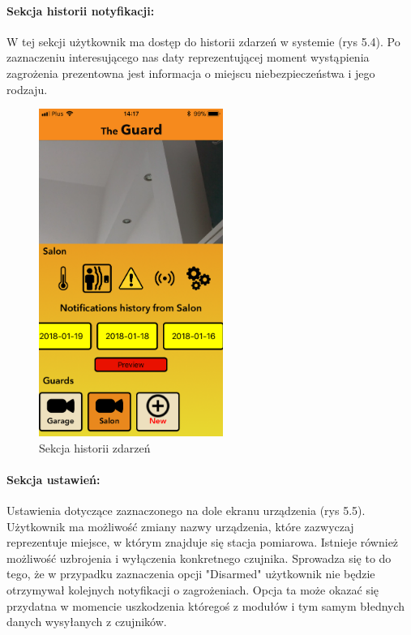 \paragraph{Sekcja historii notyfikacji:}
W tej sekcji użytkownik ma dostęp do historii zdarzeń w systemie (rys 5.4). Po zaznaczeniu interesującego nas daty reprezentującej moment wystąpienia zagrożenia prezentowna jest informacja o miejscu niebezpieczeństwa i jego rodzaju.

\begin{figure}[h]
	\centering
	\includegraphics[width=6cm]{history.png}
	\caption{Sekcja historii zdarzeń}
\end{figure}


\paragraph{Sekcja ustawień:}
Ustawienia dotyczące zaznaczonego na dole ekranu urządzenia (rys 5.5). Użytkownik ma możliwość zmiany nazwy urządzenia, które zazwyczaj reprezentuje miejsce, w którym znajduje się stacja pomiarowa. Istnieje również możliwość uzbrojenia i wyłączenia konkretnego czujnika. Sprowadza się to do tego, że w przypadku zaznaczenia opcji "Disarmed" użytkownik nie będzie otrzymywał kolejnych notyfikacji o zagrożeniach. Opcja ta może okazać się przydatna w momencie uszkodzenia któregoś z modułów i tym samym błednych danych wysyłanych z czujników.

